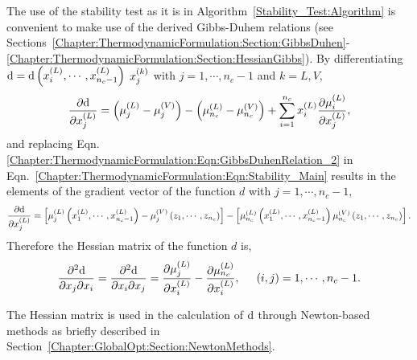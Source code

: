 The use of the stability test as it is in Algorithm~\ref{Stability_Test:Algorithm} is convenient to make use of the derived Gibbs-Duhem relations (see Sections~\ref{Chapter:ThermodynamicFormulation:Section:GibbsDuhen}-\ref{Chapter:ThermodynamicFormulation:Section:HessianGibbs}). By differentiating $\d=\d\left(\mfr[x]{i}{L}, \cdots, \mfr[x]{n_{c}-1}{L}\right)$ \wrt $\mfr[x]{j}{k}$ with $j=1,\cdots,n_{c}-1$ and $k=L,V$,
\begin{equation}
   \frc{\partial\d}{\partial\mfr[x]{j}{L}} = \left(\mfr[\mu]{j}{L}-\mfr[\mu]{j}{V}\right) - \left(\mfr[\mu]{n_{c}}{L}-\mfr[\mu]{n_{c}}{V}\right) + \summation_{i=1}^{n_{c}}\mfr[x]{i}{L}\frc{\partial\mfr[\mu]{i}{L}}{\partial\mfr[x]{j}{L}},
\end{equation}
and replacing Eqn.\ref{Chapter:ThermodynamicFormulation:Eqn:GibbsDuhenRelation_2} in Eqn.~\ref{Chapter:ThermodynamicFormulation:Eqn:Stability_Main} results in the elements of the gradient vector of the function $d$ with $j=1,\cdots,n_{c}-1$,
\begin{equation}
   \frc{\partial\d}{\partial\mfr[x]{j}{L}} = \left[\mfr[\mu]{j}{L}\left(\mfr[x]{1}{L},\cdots,\mfr[x]{n_{c}-1}{L}\right) - \mfr[\mu]{j}{V}\left(z_{1},\cdots,z_{n_{c}}\right)\right] - \left[\mfr[\mu]{n_{c}}{L}\left(\mfr[x]{1}{L},\cdots,\mfr[x]{n_{c}-1}{L}\right) \mfr[\mu]{n_{c}}{V}\left(z_{1},\cdots,z_{n_{c}}\right)\right].
\end{equation}
Therefore the Hessian matrix of the function $d$ is,
\begin{equation}
   \frc{\partial^{2}\d}{\partial x_{j}\partial x_{i}} =  \frc{\partial^{2}\d}{\partial x_{i}\partial x_{j}} = \frc{\partial\mfr[\mu]{j}{L}}{\partial\mfr[x]{i}{L}} - \frc{\partial\mfr[\mu]{n_{c}}{L}}{\partial\mfr[x]{i}{L}}, \hspace{.5cm} (i,j)=1,\cdots,n_{c}-1.
\end{equation}

The Hessian matrix is used in the calculation of $\d$ through Newton-based methods as briefly described in Section~\ref{Chapter:GlobalOpt:Section:NewtonMethods}.

